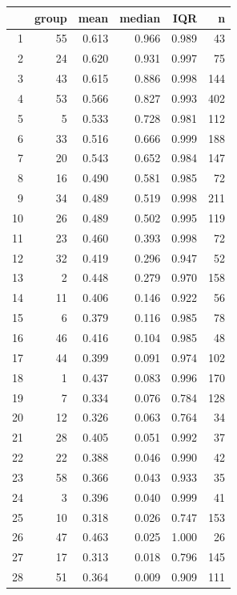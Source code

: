 \begin{table}[ht]
\centering
\begin{tabular}{rrrrrr}
  \toprule
 & group & mean & median & IQR & n \\ 
  \midrule
1 & 55 & 0.613 & 0.966 & 0.989 & 43 \\ 
  2 & 24 & 0.620 & 0.931 & 0.997 & 75 \\ 
  3 & 43 & 0.615 & 0.886 & 0.998 & 144 \\ 
  4 & 53 & 0.566 & 0.827 & 0.993 & 402 \\ 
  5 & 5 & 0.533 & 0.728 & 0.981 & 112 \\ 
  6 & 33 & 0.516 & 0.666 & 0.999 & 188 \\ 
  7 & 20 & 0.543 & 0.652 & 0.984 & 147 \\ 
  8 & 16 & 0.490 & 0.581 & 0.985 & 72 \\ 
  9 & 34 & 0.489 & 0.519 & 0.998 & 211 \\ 
  10 & 26 & 0.489 & 0.502 & 0.995 & 119 \\ 
  11 & 23 & 0.460 & 0.393 & 0.998 & 72 \\ 
  12 & 32 & 0.419 & 0.296 & 0.947 & 52 \\ 
  13 & 2 & 0.448 & 0.279 & 0.970 & 158 \\ 
  14 & 11 & 0.406 & 0.146 & 0.922 & 56 \\ 
  15 & 6 & 0.379 & 0.116 & 0.985 & 78 \\ 
  16 & 46 & 0.416 & 0.104 & 0.985 & 48 \\ 
  17 & 44 & 0.399 & 0.091 & 0.974 & 102 \\ 
  18 & 1 & 0.437 & 0.083 & 0.996 & 170 \\ 
  19 & 7 & 0.334 & 0.076 & 0.784 & 128 \\ 
  20 & 12 & 0.326 & 0.063 & 0.764 & 34 \\ 
  21 & 28 & 0.405 & 0.051 & 0.992 & 37 \\ 
  22 & 22 & 0.388 & 0.046 & 0.990 & 42 \\ 
  23 & 58 & 0.366 & 0.043 & 0.933 & 35 \\ 
  24 & 3 & 0.396 & 0.040 & 0.999 & 41 \\ 
  25 & 10 & 0.318 & 0.026 & 0.747 & 153 \\ 
  26 & 47 & 0.463 & 0.025 & 1.000 & 26 \\ 
  27 & 17 & 0.313 & 0.018 & 0.796 & 145 \\ 
  28 & 51 & 0.364 & 0.009 & 0.909 & 111 \\ 

\end{tabular}
\end{table}
